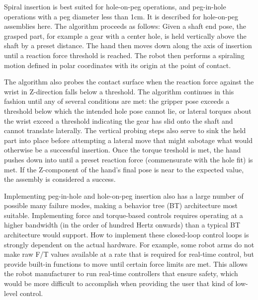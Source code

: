 Spiral insertion is best suited for hole-on-peg operations, and peg-in-hole operations with a peg diameter less than 1cm. It is described for hole-on-peg assemblies here. The algorithm proceeds as follows: Given a shaft end pose, the grasped part, for example a gear with a center hole, is held vertically above the shaft by a preset distance.  The hand then moves down along the axis of insertion until a reaction force threshold is reached.  The robot then performs a spiraling motion defined in polar coordinates with its origin at the point of contact.

The algorithm also probes the contact surface when the reaction force against the wrist in Z-direction falls below a threshold.  The algorithm continues in this fashion until any of several conditions are met: the gripper pose exceeds a threshold below which the intended hole pose cannot lie, or lateral torques about the wrist exceed a threshold indicating the gear has slid onto the shaft and cannot translate laterally.  The vertical probing steps also serve to sink the held part into place before attempting a lateral move that might sabotage what would otherwise be a successful insertion.  Once the torque treshold is met, the hand pushes down into until a preset reaction force (commensurate with the hole fit) is met.  If the Z-component of the hand's final pose is near to the expected value, the assembly is considered a success.

Implementing peg-in-hole and hole-on-peg insertion also has a large number of possible many failure modes, making a behavior tree (BT) architecture most suitable. Implementing force and torque-based controls requires operating at a higher bandwidth (in the order of hundred Hertz onwards) than a typical BT architecture  would support. How to implement these closed-loop control loops is strongly dependent on the actual hardware. For example, some robot arms do not make raw F/T values available at a rate that is required for real-time control, but provide built-in functions to move until certain force limits are met. This allows the robot manufacturer to run real-time controllers that ensure safety, which would be more difficult to accomplish when providing the user that kind of low-level control. 



